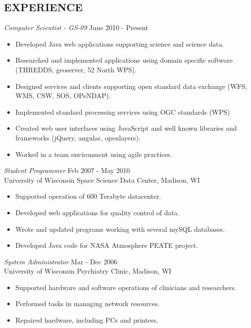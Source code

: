 \documentclass[line,margin]{res}
\begin{document}
\begin{resume}
\section{EXPERIENCE}
		{\sl Computer Scientist - GS-09} \hfill June 2010 - Present \\
	     \begin{itemize} \itemsep -2pt %
		\item Developed Java web applications supporting science and science data.
		\item Researched and implemented applications using domain specific software (THREDDS, geoserver, 52 North WPS).
		\item Designed services and clients supporting open standard data exchange (WFS, WMS, CSW, SOS, OPeNDAP).
		\item Implemented standard processing services using OGC standards (WPS)
		\item Created web user interfaces using JavaScript and well known libraries and frameworks (jQuery, angular, openlayers).
		\item Worked in a team environment using agile practices.
	     \end{itemize}
		{\sl Student Programmer} \hfill Feb 2007 - May 2010 \\
                University of Wisconsin Space Science Data Center, Madison, WI
                \begin{itemize} \itemsep -2pt %
                 	\item Supported operation of 600 Terabyte datacenter.
		\item Developed web applications for quality control of data.
		\item Wrote and updated programs working with several mySQL databases.
                 	\item Developed Java code for NASA Atmosphere PEATE project. 
                \end{itemize}
		{\sl System Administrator} \hfill Mar - Dec 2006 \\
                University of Wisconsin Psychiatry Clinic, Madison, WI 
                \begin{itemize} \itemsep -2pt %
                 	\item Supported hardware and software operations of clinicians and researchers.
		\item Performed tasks in managing network resources.
		\item Repaired hardware, including PCs and printers.

\end{itemize}
\end{resume}
\end{document}
